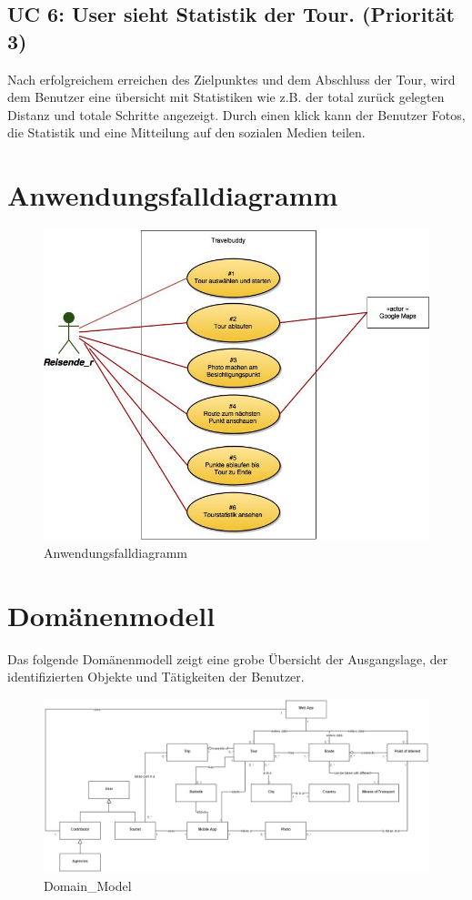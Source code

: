 \documentclass[a4paper,10pt,xetex]{article}
\begin{document}
\subsection{UC 6: User sieht Statistik der Tour. (Priorität
3)}\label{uc-6-user-sieht-statistik-der-tour.-priorituxe4t-3}

Nach erfolgreichem erreichen des Zielpunktes und dem Abschluss der Tour,
wird dem Benutzer eine übersicht mit Statistiken wie z.B. der total
zurück gelegten Distanz und totale Schritte angezeigt. Durch einen klick
kann der Benutzer Fotos, die Statistik und eine Mitteilung auf den
sozialen Medien teilen.

\section{Anwendungsfalldiagramm}\label{anwendungsfalldiagramm}

\begin{figure}
\centering
\includegraphics{Anwendungsfalldiagramm.jpg}
\caption{Anwendungsfalldiagramm}
\end{figure}

\section{Domänenmodell}\label{domuxe4nenmodell}

Das folgende Domänenmodell zeigt eine grobe Übersicht der Ausgangslage,
der identifizierten Objekte und Tätigkeiten der Benutzer.

\begin{figure}
\centering
\includegraphics{domain_model1.jpg}
\caption{Domain\_Model}
\end{figure}
\end{document}

